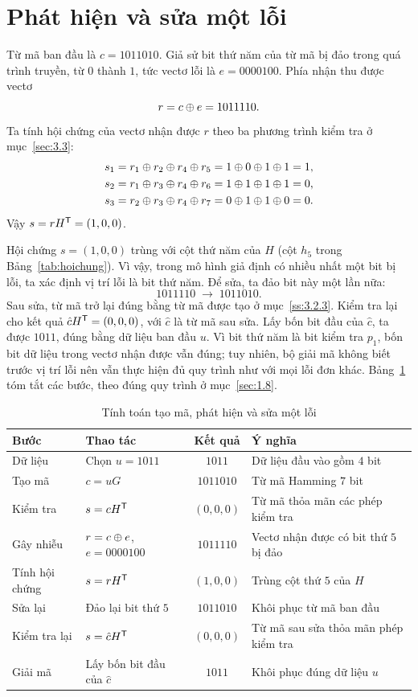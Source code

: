 \section{Phát hiện và sửa một lỗi}
\label{sec:3.4}

Từ mã ban đầu là $c = 1011010$. Giả sử bit thứ năm của từ mã bị đảo trong quá
trình truyền, từ $0$ thành $1$, tức vectơ lỗi là $e = 0000100$. Phía nhận thu
được vectơ
\[
  r = c \oplus e = 1011110 .
\]
Ta tính hội chứng của vectơ nhận được $r$ theo ba phương trình kiểm tra ở
mục~\ref{sec:3.3}:
\begin{align*}
  s_1 &= r_1 \oplus r_2 \oplus r_4 \oplus r_5 = 1 \oplus 0 \oplus 1 \oplus 1 = 1,\\*
  s_2 &= r_1 \oplus r_3 \oplus r_4 \oplus r_6 = 1 \oplus 1 \oplus 1 \oplus 1 = 0,\\*
  s_3 &= r_2 \oplus r_3 \oplus r_4 \oplus r_7 = 0 \oplus 1 \oplus 1 \oplus 0 = 0 .
\end{align*}
Vậy $s = rH^{\mathsf{T}} = (1,0,0)$.

Hội chứng $s = (1,0,0)$ trùng với cột thứ năm của $H$ (cột $h_5$ trong
Bảng~\ref{tab:hoichung}). Vì vậy, trong mô hình giả định có nhiều nhất một bit
bị lỗi, ta xác định vị trí lỗi là bit thứ năm. Để
sửa, ta đảo bit này một lần nữa:
\[
  1011110 \;\to\; 1011010 .
\]
Sau sửa, từ mã trở lại đúng bằng từ mã được tạo ở mục~\ref{ss:3.2.3}. Kiểm tra
lại cho kết quả $\hat{c}H^{\mathsf{T}} = (0,0,0)$, với $\hat{c}$ là từ mã sau sửa. Lấy bốn bit
đầu của $\hat{c}$, ta được $1011$, đúng bằng dữ liệu ban đầu $u$. Vì bit thứ năm
là bit kiểm tra $p_1$, bốn bit dữ liệu trong vectơ nhận được vẫn đúng; tuy
nhiên, bộ giải mã không biết trước vị trí lỗi nên vẫn thực hiện đủ quy trình
như với mọi lỗi đơn khác. Bảng~\ref{tab:motloi} tóm tắt các bước, theo đúng quy
trình ở mục~\ref{sec:1.8}.

\begin{table}[H]
\centering\small\renewcommand{\arraystretch}{1.1}
\caption{Tính toán tạo mã, phát hiện và sửa một lỗi}
\label{tab:motloi}
\begin{tabular}{|l|l|c|l|}
\hline
\textbf{Bước} & \textbf{Thao tác} & \textbf{Kết quả} & \textbf{Ý nghĩa}\\ \hline
Dữ liệu & Chọn $u = 1011$ & $1011$ & Dữ liệu đầu vào gồm $4$ bit\\ \hline
Tạo mã & $c = uG$ & $1011010$ & Từ mã Hamming $7$ bit\\ \hline
Kiểm tra & $s = cH^{\mathsf{T}}$ & $(0,0,0)$ & Từ mã thỏa mãn các phép kiểm tra\\ \hline
Gây nhiễu & $r = c \oplus e$, $e = 0000100$ & $1011110$ & Vectơ nhận được có bit thứ $5$ bị đảo\\ \hline
Tính hội chứng & $s = rH^{\mathsf{T}}$ & $(1,0,0)$ & Trùng cột thứ $5$ của $H$\\ \hline
Sửa lại & Đảo lại bit thứ $5$ & $1011010$ & Khôi phục từ mã ban đầu\\ \hline
Kiểm tra lại & $s = \hat{c}H^{\mathsf{T}}$ & $(0,0,0)$ & Từ mã sau sửa thỏa mãn phép kiểm tra\\ \hline
Giải mã & Lấy bốn bit đầu của $\hat{c}$ & $1011$ & Khôi phục đúng dữ liệu $u$\\ \hline
\end{tabular}
\end{table}

